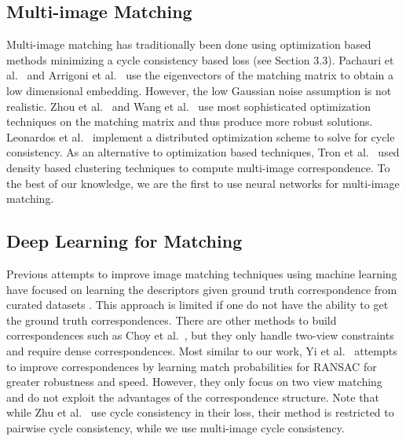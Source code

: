 \documentclass[10pt,twocolumn,letterpaper]{article}
\begin{document}
\subsection{Multi-image Matching}
Multi-image matching has traditionally been done using optimization based methods minimizing a cycle consistency based loss (see Section 3.3).
Pachauri et al.~\cite{pachauri2013solving} and Arrigoni et al.~\cite{arrigoni2017synchronization} use the eigenvectors of the matching matrix to obtain a low dimensional embedding. 
However, the low Gaussian noise assumption is not realistic.
Zhou et al.~\cite{zhou2015multi} and Wang et al.~\cite{wang2017multi} use most sophisticated optimization techniques on the matching matrix and thus produce more robust solutions.
Leonardos et al.~\cite{leonardos2016distributed} implement a distributed optimization scheme to solve for cycle consistency.
As an alternative to optimization based techniques, Tron et al.~\cite{tron2017fast} used density based clustering techniques to compute multi-image correspondence.
To the best of our knowledge, we are the first to use neural networks for multi-image matching.

\subsection{Deep Learning for Matching}
Previous attempts to improve image matching techniques using machine learning have focused on learning the descriptors given ground truth correspondence from curated datasets \cite{zagoruyko2015learning, yi2016lift, brachmann2017dsac}.
This approach is limited if one do not have the ability to get the ground truth correspondences.
There are other methods to build correspondences such as Choy et al.~\cite{choy2016universal}, but they only handle two-view constraints and require dense correspondences.
Most similar to our work, Yi et al.~\cite{yi2018learning} attempts to improve correspondences by learning match probabilities for RANSAC for greater robustness and speed.
However, they only focus on two view matching and do not exploit the advantages of the correspondence structure.
Note that while Zhu et al.~\cite{zhu2017unpaired} use cycle consistency in their loss, their method is restricted to pairwise cycle consistency, while we use multi-image cycle consistency.
\end{document}
